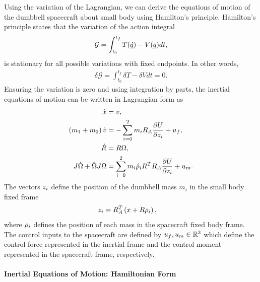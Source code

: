 Using the variation of the Lagrangian, we can derive the equations of motion of the dumbbell spacecraft about small body using Hamilton's principle. 
Hamilton's principle states that the variation of the action integral
\begin{align}\label{eq:action_integral}
    \mathcal{G} = \int_{t_0}^{t_f} T(\dot{q}) - V(q) dt,
\end{align}
is stationary for all possible variations with fixed endpoints. 
In other words, 
\begin{align}\label{eq:hamiltons_principle}
    \delta \mathcal{G}  = \int_{t_0}^{t_f} \delta T - \delta V dt = 0.
\end{align}
Ensuring the variation is zero and using integration by parts, the inertial equations of motion can be written in Lagrangian form as
\begin{align}
    \dot{x} &= v, \label{eq:inertial_position_dynamics}\\
    \left( m_1 + m_2 \right) \dot{v} &= - \sum_{i=0}^2 m_i R_A \frac{\partial U}{\partial z_i} + u_f, \label{eq:inertial_velocity_dynamics}\\
    \dot{R} &= R \Omega, \label{eq:inertial_attitude_dynamics}\\
    J \dot{\Omega} + \hat{\Omega} J \Omega &= \sum_{i=0}^2 m_i \hat{\rho}_i R^T R_A \frac{\partial U}{\partial z_i} + u_m. \label{eq:inertial_angvel_dynamics}
\end{align}
The vectors \( z_i \) define the position of the dumbbell mass \( m_i \) in the small body fixed frame
\begin{align}\label{eq:mass_asteroid_frame}
    z_i &= R_A^T \left( x + R \rho_i \right),
\end{align}
where \( \rho_i \) defines the position of each mass in the spacecraft fixed body frame.
The control inputs to the spacecraft are defined by \( u_f, u_m \in \mathbb{R}^3 \) which define the control force represented in the inertial frame and the control moment represented in the spacecraft frame, respectively. 

\paragraph{Inertial Equations of Motion: Hamiltonian Form}\label{sec:inertial_hamiltonian_form}

